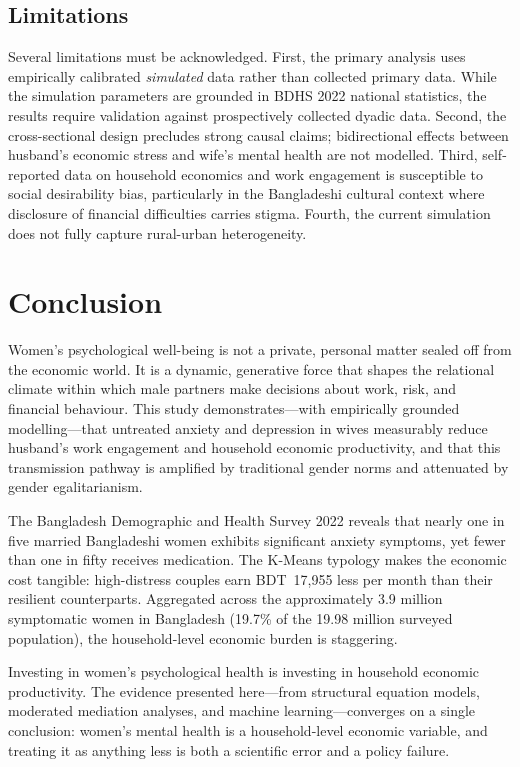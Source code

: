 \documentclass[12pt, a4paper]{article}
\begin{document}
\subsection{Limitations}\label{sec:limitations}

Several limitations must be acknowledged. First, the primary analysis uses empirically calibrated \emph{simulated} data rather than collected primary data. While the simulation parameters are grounded in BDHS 2022 national statistics, the results require validation against prospectively collected dyadic data. Second, the cross-sectional design precludes strong causal claims; bidirectional effects between husband's economic stress and wife's mental health are not modelled. Third, self-reported data on household economics and work engagement is susceptible to social desirability bias, particularly in the Bangladeshi cultural context where disclosure of financial difficulties carries stigma. Fourth, the current simulation does not fully capture rural-urban heterogeneity.


\section{Conclusion}\label{sec:conclusion}

Women's psychological well-being is not a private, personal matter sealed off from the economic world. It is a dynamic, generative force that shapes the relational climate within which male partners make decisions about work, risk, and financial behaviour. This study demonstrates—with empirically grounded modelling—that untreated anxiety and depression in wives measurably reduce husband's work engagement and household economic productivity, and that this transmission pathway is amplified by traditional gender norms and attenuated by gender egalitarianism.

The Bangladesh Demographic and Health Survey 2022 reveals that nearly one in five married Bangladeshi women exhibits significant anxiety symptoms, yet fewer than one in fifty receives medication. The K-Means typology makes the economic cost tangible: high-distress couples earn BDT~17,955 less per month than their resilient counterparts. Aggregated across the approximately 3.9 million symptomatic women in Bangladesh (19.7\% of the 19.98 million surveyed population), the household-level economic burden is staggering.

Investing in women's psychological health is investing in household economic productivity. The evidence presented here—from structural equation models, moderated mediation analyses, and machine learning—converges on a single conclusion: women's mental health is a household-level economic variable, and treating it as anything less is both a scientific error and a policy failure.


\newpage

\end{document}
